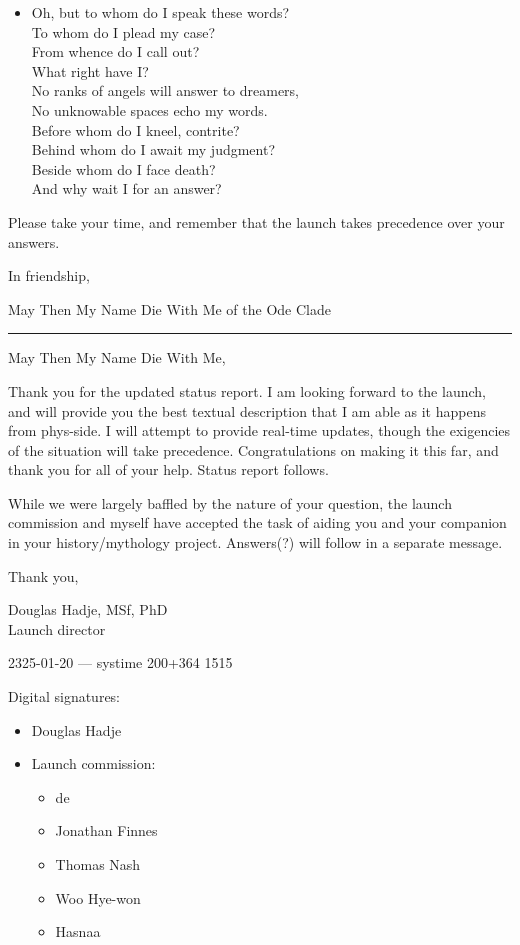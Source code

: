\begin{itemize}
\item
  Oh, but to whom do I speak these words?\\
  To whom do I plead my case?\\
  From whence do I call out?\\
  What right have I?\\
  No ranks of angels will answer to dreamers,\\
  No unknowable spaces echo my words.\\
  Before whom do I kneel, contrite?\\
  Behind whom do I await my judgment?\\
  Beside whom do I face death?\\
  And why wait I for an answer?
\end{itemize}

Please take your time, and remember that the launch takes precedence over your answers.

In friendship,

May Then My Name Die With Me of the Ode Clade

\begin{center}\rule{0.5\linewidth}{0.5pt}\end{center}

May Then My Name Die With Me,

Thank you for the updated status report. I am looking forward to the launch, and will provide you the best textual description that I am able as it happens from phys-side. I will attempt to provide real-time updates, though the exigencies of the situation will take precedence. Congratulations on making it this far, and thank you for all of your help. Status report follows.

While we were largely baffled by the nature of your question, the launch commission and myself have accepted the task of aiding you and your companion in your history/mythology project. Answers(?) will follow in a separate message.

Thank you,

Douglas Hadje, MSf, PhD\\
Launch director

2325-01-20 — systime 200+364 1515

Digital signatures:

\begin{itemize}
\tightlist
\item
  Douglas Hadje
\item
  Launch commission:

  \begin{itemize}
  \tightlist
  \item
    de
  \item
    Jonathan Finnes
  \item
    Thomas Nash
  \item
    Woo Hye-won
  \item
    Hasnaa
  \end{itemize}
\end{itemize}

